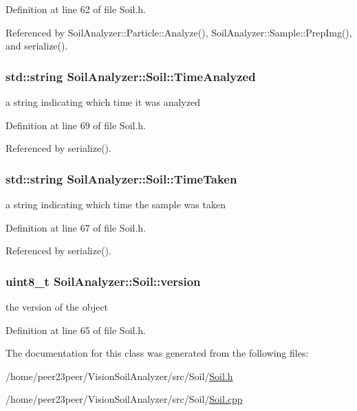 Definition at line 62 of file Soil.\+h.



Referenced by Soil\+Analyzer\+::\+Particle\+::\+Analyze(), Soil\+Analyzer\+::\+Sample\+::\+Prep\+Img(), and serialize().

\hypertarget{class_soil_analyzer_1_1_soil_a3c1c025be53aae3cbe858b7a7936d8dd}{}
\subsubsection[{Time\+Analyzed}]{\setlength{\rightskip}{0pt plus 5cm}std\+::string Soil\+Analyzer\+::\+Soil\+::\+Time\+Analyzed}\label{class_soil_analyzer_1_1_soil_a3c1c025be53aae3cbe858b7a7936d8dd}
a string indicating which time it was analyzed 

Definition at line 69 of file Soil.\+h.



Referenced by serialize().

\hypertarget{class_soil_analyzer_1_1_soil_ae459914e6c463e97d1761d791f653b2d}{}
\subsubsection[{Time\+Taken}]{\setlength{\rightskip}{0pt plus 5cm}std\+::string Soil\+Analyzer\+::\+Soil\+::\+Time\+Taken}\label{class_soil_analyzer_1_1_soil_ae459914e6c463e97d1761d791f653b2d}
a string indicating which time the sample was taken 

Definition at line 67 of file Soil.\+h.



Referenced by serialize().

\hypertarget{class_soil_analyzer_1_1_soil_ac32132912c73338edf60b5cd6de4feb8}{}
\subsubsection[{version}]{\setlength{\rightskip}{0pt plus 5cm}uint8\+\_\+t Soil\+Analyzer\+::\+Soil\+::version}\label{class_soil_analyzer_1_1_soil_ac32132912c73338edf60b5cd6de4feb8}
the version of the object 

Definition at line 65 of file Soil.\+h.



The documentation for this class was generated from the following files\+:\begin{DoxyCompactItemize}
\item 
/home/peer23peer/\+Vision\+Soil\+Analyzer/src/\+Soil/\hyperlink{_soil_8h}{Soil.\+h}\item 
/home/peer23peer/\+Vision\+Soil\+Analyzer/src/\+Soil/\hyperlink{_soil_8cpp}{Soil.\+cpp}\end{DoxyCompactItemize}
